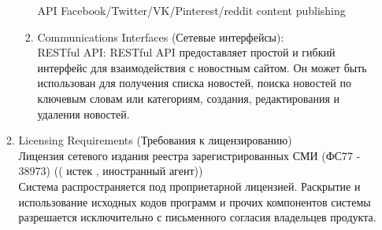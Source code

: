 \begin{enumerate}
\begin{enumerate}[label=3.\arabic*]
\begin{enumerate}[label=3.6.\arabic*]
            API Facebook/Twitter/VK/Pinterest/reddit content publishing
            \item Communications Interfaces (Сетевые интерфейсы): \\
            RESTful API: RESTful API предоставляет простой и гибкий интерфейс для взаимодействия с новостным сайтом.
            Он может быть использован для получения списка новостей, поиска новостей по ключевым словам или категориям,
            создания, редактирования и удаления новостей.\\
        \end{enumerate}
        \item Licensing Requirements (Требования к лицензированию) \\
        \BgThispage
        Лицензия сетевого издания реестра зарегистрированных СМИ (ФС77 - 38973) (( истек , иностранный агент)) \\
        Система распространяется под проприетарной лицензией. Раскрытие и использование исходных кодов программ и прочих компонентов системы разрешается исключительно с письменного согласия владельцев продукта.
    \end{enumerate}
\end{enumerate}
\newpage
\BgThispage
